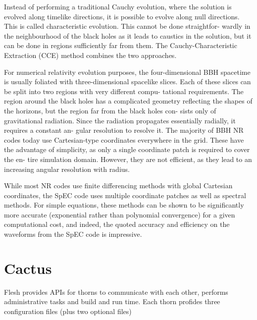 Instead of performing a traditional Cauchy evolution, where the solution is evolved along timelike directions, it is possible to evolve along null directions. This is called characteristic evolution. This cannot be done straightfor- wardly in the neighbourhood of the black holes as it leads to caustics in the solution, but it can be done in regions sufficiently far from them. The Cauchy-Characteristic Extraction (CCE) method combines the two approaches.

For numerical relativity evolution purposes, the four-dimensional BBH spacetime is usually foliated with three-dimensional spacelike slices. Each of these slices can be split into two regions with very different compu- tational requirements. The region around the black holes has a complicated geometry reflecting the shapes of the horizons, but the region far from the black holes con- sists only of gravitational radiation. Since the radiation propagates essentially radially, it requires a constant an- gular resolution to resolve it. The majority of BBH NR codes today use Cartesian-type coordinates everywhere in the grid. These have the advantage of simplicity, as only a single coordinate patch is required to cover the en- tire simulation domain. However, they are not efficient, as they lead to an increasing angular resolution with radius. 

While most NR codes use finite differencing methods with global Cartesian coordinates, the SpEC code uses multiple coordinate patches as well as spectral methods. For simple equations, these methods can be shown to be significantly more accurate (exponential rather than polynomial convergence) for a given computational cost, and indeed, the quoted accuracy and efficiency on the waveforms from the SpEC code is impressive.

\section{Cactus}
Flesh provides APIs for thorns to communicate with each other, performs administrative tasks and build and run time. Each thorn profides three configuration files (plus two optional files)


%